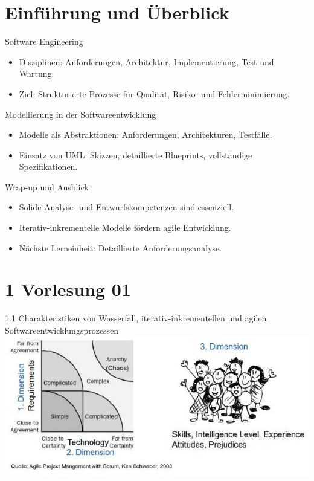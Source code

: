 \section{Einführung und Überblick}

\begin{definition}{Software Engineering}
\begin{itemize}
    \item Disziplinen: Anforderungen, Architektur, Implementierung, Test und Wartung.
    \item Ziel: Strukturierte Prozesse für Qualität, Risiko- und Fehlerminimierung.
\end{itemize}
\end{definition}

\begin{definition}{Modellierung in der Softwareentwicklung}
\begin{itemize}
    \item Modelle als Abstraktionen: Anforderungen, Architekturen, Testfälle.
    \item Einsatz von UML: Skizzen, detaillierte Blueprints, vollständige Spezifikationen.
    \end{itemize}
\end{definition}

\begin{definition}{Wrap-up und Ausblick}
\begin{itemize}
    \item Solide Analyse- und Entwurfskompetenzen sind essenziell.
    \item Iterativ-inkrementelle Modelle fördern agile Entwicklung.
    \item Nächste Lerneinheit: Detaillierte Anforderungsanalyse.
\end{itemize}
\end{definition}

\section*{1 Vorlesung 01}
1.1 Charakteristiken von Wasserfall, iterativ-inkrementellen und agilen Softwareentwicklungsprozessen\\
\includegraphics[width=\textwidth]{images/2024_12_29_0d1d7b5551ea1b4b41bdg-01}

